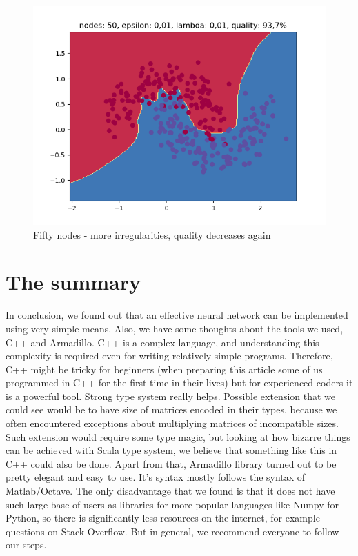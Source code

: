 \documentclass[3p,twocolumn]{elsarticle}
\begin{document}
\begin{figure}[h!]
\label{fig:fig5}
  \includegraphics[width=\linewidth]{wykresy/21.png}
	\caption{ Fifty nodes - more irregularities, quality decreases again}
	\label{fig5}
\end{figure}

\section{The summary}

In conclusion, we found out that an effective neural network can be implemented using very simple means. Also, we have some thoughts about the tools we used, C++ and Armadillo. C++ is a complex language, and understanding this complexity is required even for writing relatively simple programs. Therefore, C++ might be tricky for beginners (when preparing this article some of us programmed in C++ for the first time in their lives) but for experienced coders it is a powerful tool. Strong type system really helps. Possible extension that we could see would be to have size of matrices encoded in their types, because we often encountered exceptions about multiplying matrices of incompatible sizes. Such extension would require some type magic, but looking at how bizarre things can be achieved with Scala type system, we believe that something like this in C++ could also be done. Apart from that, Armadillo library turned out to be pretty elegant and easy to use. It's syntax mostly follows the syntax of Matlab/Octave. The only disadvantage that we found is that it does not have such large base of users as libraries for more popular languages like Numpy for Python, so there is significantly less resources on the internet, for example questions on Stack Overflow. But in general, we recommend everyone to follow our steps. 
\end{document}
